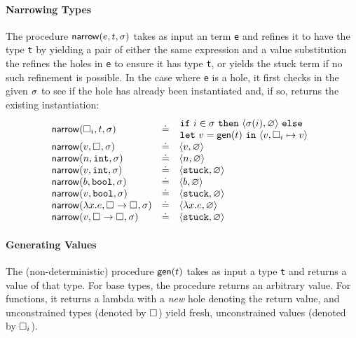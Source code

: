 \paragraph{Narrowing Types} The procedure $\mathsf{narrow}(e, t, \sigma)$ takes as
input an term \texttt{e} and refines it to have the type \texttt{t} by
yielding a pair of either the same expression and a value substitution
the refines the holes in \texttt{e} to ensure it has type \texttt{t}, or
yields the stuck term if no such refinement is possible. In the case
where \texttt{e} is a hole, it first checks in the given $\sigma$ to see
if the hole has already been instantiated and, if so, returns the
existing instantiation:
%
$$
\begin{array}{lcl}
\mathsf{narrow}(\square_{i}, t, \sigma) & \doteq & \hspace{-1ex} \begin{array}{l}
    \mathtt{if}\ i \in \sigma\ \mathtt{then}\ \langle \sigma(i), \varnothing \rangle\ \mathtt{else} \\
         \mathtt{let}\ v = \mathsf{gen}(t)\ \mathtt{in}\ \langle v, \square_{i} \mapsto v \rangle
  \end{array} \\
\mathsf{narrow}(v, \square_{}, \sigma)  & \doteq & \langle v, \varnothing \rangle \\
\mathsf{narrow}(n, \mathtt{int}, \sigma)     & \doteq & \langle n, \varnothing \rangle \\
\mathsf{narrow}(v, \mathtt{int}, \sigma)     & \doteq & \langle \mathtt{stuck}, \varnothing \rangle \\
\mathsf{narrow}(b, \mathtt{bool}, \sigma)    & \doteq & \langle b, \varnothing \rangle \\
\mathsf{narrow}(v, \mathtt{bool}, \sigma)    & \doteq & \langle \mathtt{stuck}, \varnothing \rangle \\
\mathsf{narrow}(\lambda x. e, {\square_{}} \rightarrow \square_{}, \sigma) & \doteq & \langle \lambda x. e, \varnothing \rangle \\
\mathsf{narrow}(v, {\square_{}} \rightarrow \square_{}, \sigma) & \doteq & \langle \mathtt{stuck}, \varnothing \rangle \\
\end{array}
$$

\paragraph{Generating Values} The (non-deterministic) procedure $\mathsf{gen}(t)$
takes as input a type \texttt{t} and returns a value of that type. For base
types, the procedure returns an arbitrary value. For functions, it returns
a lambda with a \emph{new} hole denoting the return value, and unconstrained
types (denoted by $\square_{}$) yield fresh, unconstrained values
(denoted by $\square_{i}$).

